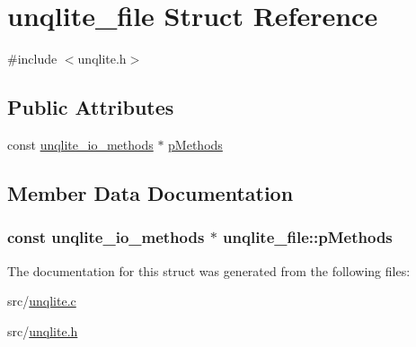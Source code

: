 \hypertarget{structunqlite__file}{\section{unqlite\-\_\-file Struct Reference}
\label{d0/d62/structunqlite__file}
}


{\ttfamily \#include $<$unqlite.\-h$>$}

\subsection*{Public Attributes}
\begin{DoxyCompactItemize}
\item 
const \hyperlink{structunqlite__io__methods}{unqlite\-\_\-io\-\_\-methods} $\ast$ \hyperlink{structunqlite__file_ac79ef53419799f2f3a818f5e0c8b3871}{p\-Methods}
\end{DoxyCompactItemize}


\subsection{Member Data Documentation}
\hypertarget{structunqlite__file_ac79ef53419799f2f3a818f5e0c8b3871}{
\subsubsection[{p\-Methods}]{\setlength{\rightskip}{0pt plus 5cm}const {\bf unqlite\-\_\-io\-\_\-methods} $\ast$ unqlite\-\_\-file\-::p\-Methods}}\label{d0/d62/structunqlite__file_ac79ef53419799f2f3a818f5e0c8b3871}


The documentation for this struct was generated from the following files\-:\begin{DoxyCompactItemize}
\item 
src/\hyperlink{unqlite_8c}{unqlite.\-c}\item 
src/\hyperlink{unqlite_8h}{unqlite.\-h}\end{DoxyCompactItemize}
